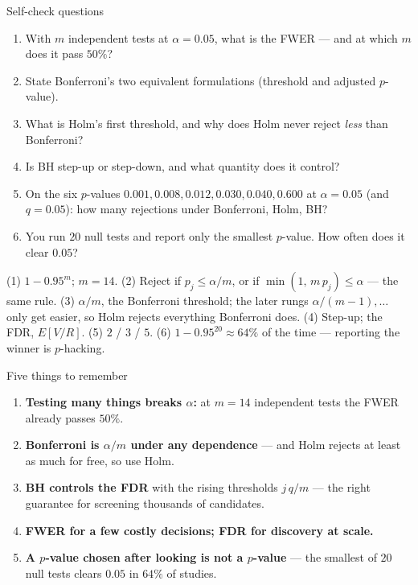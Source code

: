 \documentclass[aspectratio=169,11pt]{beamer}
\begin{document}
\begin{frame}{Self-check questions}
  \scriptsize
  \begin{readme}
    \begin{enumerate}
      \item With $m$ independent tests at $\alpha=0.05$, what is the FWER ---
            and at which $m$ does it pass $50\%$?
      \item State Bonferroni's two equivalent formulations (threshold and
            adjusted $p$-value).
      \item What is Holm's first threshold, and why does Holm never reject
            \emph{less} than Bonferroni?
      \item Is BH step-up or step-down, and what quantity does it control?
      \item On the six $p$-values $0.001, 0.008, 0.012, 0.030, 0.040, 0.600$
            at $\alpha=0.05$ (and $q=0.05$): how many rejections under
            Bonferroni, Holm, BH?
      \item You run $20$ null tests and report only the smallest $p$-value.
            How often does it clear $0.05$?
    \end{enumerate}
  \end{readme}
  \begin{takeaway}[{{Answers}}]
    (1) $1-0.95^m$; $m=14$. (2) Reject if $p_j\le\alpha/m$, or if
    $\min(1,\,m\,p_j)\le\alpha$ --- the same rule. (3) $\alpha/m$, the
    Bonferroni threshold; the later rungs $\alpha/(m-1),\dots$ only get easier,
    so Holm rejects everything Bonferroni does. (4) Step-up; the FDR,
    $E[V/R]$. (5) $2$ / $3$ / $5$. (6) $1-0.95^{20}\approx 64\%$ of the time ---
    reporting the winner is $p$-hacking.
  \end{takeaway}
\end{frame}

\begin{frame}{Five things to remember}
  \begin{takeaway}
    \begin{enumerate}
      \item \textbf{Testing many things breaks $\alpha$:} at $m=14$ independent tests the
            FWER already passes $50\%$.
      \item \textbf{Bonferroni is $\alpha/m$ under any dependence} --- and Holm rejects at
            least as much for free, so use Holm.
      \item \textbf{BH controls the FDR} with the rising thresholds $j\,q/m$ --- the right
            guarantee for screening thousands of candidates.
      \item \textbf{FWER for a few costly decisions; FDR for discovery at scale.}
      \item \textbf{A $p$-value chosen after looking is not a $p$-value} --- the smallest
            of $20$ null tests clears $0.05$ in $64\%$ of studies.
    \end{enumerate}
  \end{takeaway}
\end{frame}
\end{document}
